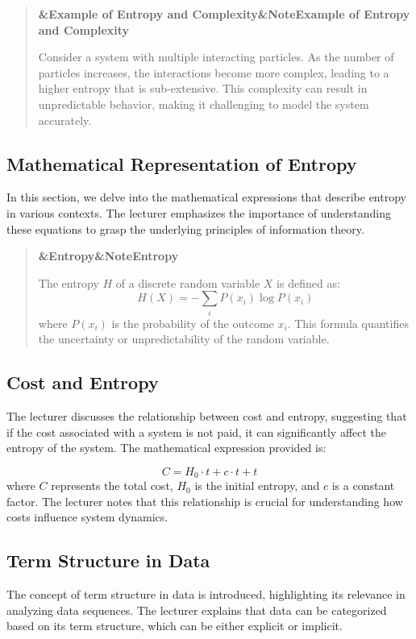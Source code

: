 \documentclass[a4paper]{article}
\newcommand{\boxheading}[1]{%
  \par\smallskip
  \noindent\textbf{\ifx&#1&Note\else#1\fi}\par
  \smallskip
}
\newenvironment{defbox}[1][]{%
  \begin{quote}\color{green!40!black}\boxheading{#1}\normalcolor
}{\end{quote}}
\newenvironment{exbox}[1][]{%
  \begin{quote}\color{brown!70!black}\boxheading{#1}\normalcolor
}{\end{quote}}
\begin{document}
\begin{exbox}[Example of Entropy and Complexity]
Consider a system with multiple interacting particles. As the number of particles increases, the interactions become more complex, leading to a higher entropy that is sub-extensive. This complexity can result in unpredictable behavior, making it challenging to model the system accurately.
\end{exbox}

\subsection{Mathematical Representation of Entropy}
In this section, we delve into the mathematical expressions that describe entropy in various contexts. The lecturer emphasizes the importance of understanding these equations to grasp the underlying principles of information theory.

\begin{defbox}[Entropy]
The entropy \( H \) of a discrete random variable \( X \) is defined as:
\begin{equation}
H(X) = -\sum_{i} P(x_i) \log P(x_i)
\end{equation}
where \( P(x_i) \) is the probability of the outcome \( x_i \). This formula quantifies the uncertainty or unpredictability of the random variable.

\end{defbox}

\subsection{Cost and Entropy}
The lecturer discusses the relationship between cost and entropy, suggesting that if the cost associated with a system is not paid, it can significantly affect the entropy of the system. The mathematical expression provided is:

\begin{equation}
C = H_0 \cdot t + c \cdot t + t
\end{equation}
where \( C \) represents the total cost, \( H_0 \) is the initial entropy, and \( c \) is a constant factor. The lecturer notes that this relationship is crucial for understanding how costs influence system dynamics.

\subsection{Term Structure in Data}
The concept of term structure in data is introduced, highlighting its relevance in analyzing data sequences. The lecturer explains that data can be categorized based on its term structure, which can be either explicit or implicit.
\end{document}
